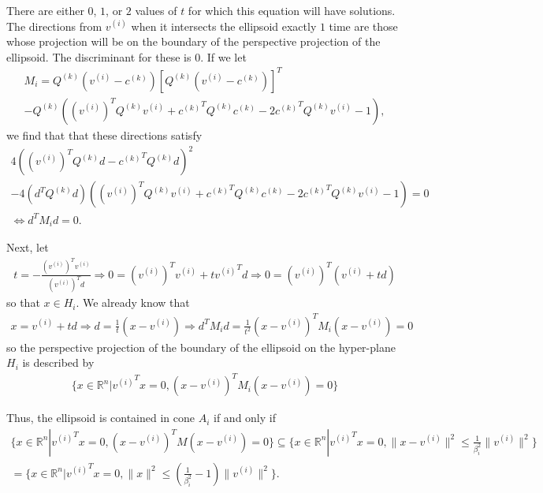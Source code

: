 \documentclass{article}
\theoremstyle{case}
\numberwithin{theorem}{subsection}
\newcommand{\ck}{{c^{(k)}}}
\newcommand{\qk}{{Q^{(k)}}}
\newcommand{\Rn}{\mathbb R^n}
\begin{document}
There are either $0$, $1$, or $2$ values of $t$ for which this equation will have solutions.
The directions from $v^{(i)}$ when it intersects the ellipsoid exactly $1$ time are those whose projection will be on the boundary of the perspective projection of the ellipsoid.
The discriminant for these is $0$.
If we let
\begin{align*}
M_i = 
\qk (v^{(i)} - \ck )\left[\qk (v^{(i)} - \ck )\right]^T \\
- \qk  \left(\left(v^{(i)}\right)^T \qk  v^{(i)} + \ck ^T \qk  \ck  - 2 \ck ^T \qk  v^{(i)} - 1\right),
\end{align*}
we find that that these directions satisfy
\begin{align*}
4\left(\left(v^{(i)}\right)^T \qk  d - \ck ^T\qk d\right)^2 \\
- 4 \left(d^T\qk d\right) \left(\left(v^{(i)}\right)^T \qk  v^{(i)} + \ck ^T \qk  \ck  - 2 \ck ^T \qk  v^{(i)} - 1\right) = 0 \\
\Longleftrightarrow d^TM_id = 0.
\end{align*}


Next, let
\begin{align*}
t = -\frac {\left(v^{(i)}\right)^T v^{(i)}}{\left(v^{(i)}\right)^T d } \Longrightarrow
0 = \left(v^{(i)}\right)^T v^{(i)} + t {v^{(i)}}^T d \Longrightarrow
0 = \left(v^{(i)}\right)^T \left(v^{(i)} + t d\right)
\end{align*}
so that $x \in H_i$.
We already know that
\begin{align*}
x = v^{(i)} + t d \Longrightarrow
d = \frac 1 t \left(x - v^{(i)}\right)
\Longrightarrow d^TM_id = \frac 1 {t^2} \left(x - v^{(i)}\right)^TM_i\left(x - v^{(i)}\right) = 0
\end{align*}
so the perspective projection of the boundary of the ellipsoid on the hyper-plane $H_i$ is described by
\begin{align*}
\{x \in \Rn | {v^{(i)}}^Tx = 0, \left(x - v^{(i)}\right)^TM_i\left(x - v^{(i)}\right) = 0\}
\end{align*}

Thus, the ellipsoid is contained in cone $A_i$ if and only if
\begin{align*}
\{x \in \Rn | {v^{(i)}}^Tx = 0, \left(x - v^{(i)}\right)^TM\left(x - v^{(i)}\right) = 0\}
\subseteq \{x \in \Rn | {v^{(i)}}^Tx = 0, \|x - v^{(i)}\|^2 \le \frac 1 {\beta_i^2}\|v^{(i)}\|^2 \} \\
= \{x \in \Rn | {v^{(i)}}^Tx = 0, \|x\|^2 \le \left(\frac 1 {\beta_i^2} - 1\right)\|v^{(i)}\|^2 \}.
\end{align*}
\end{document}

